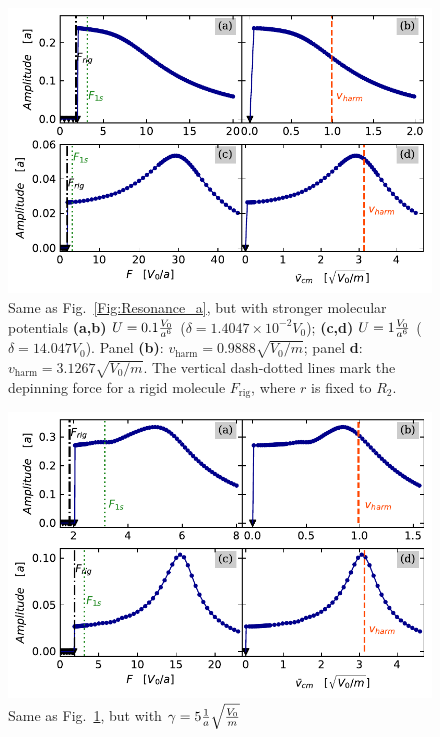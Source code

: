 \captionsetup{width=0.8\textwidth,font=normalsize}
\begin{figure}
\begin{center}
    \centering
    \includegraphics[width=0.85\linewidth]{Images/Resonance_2_b.pdf}
    \caption{Same as Fig.~\ref{Fig:Resonance_a}, but with stronger molecular potentials \textbf{(a,b)} $U = 0.1 \frac{V_0}{a^6}$ ($\delta = 1.4047 \times 10^{-2} V_0$); \textbf{(c,d)} $U = 1 \frac{V_0}{a^6}$ ($\delta = 14.047 V_0$). Panel \textbf{(b)}: $v_\text{harm} = 0.9888 \sqrt{V_0/m}$; panel \textbf{d}: $v_\text{harm} =  3.1267 \sqrt{V_0/m}$. The vertical dash-dotted lines mark the depinning force for a rigid molecule $F_\text{rig}$, where $r$ is fixed to $R_2$. }
    \label{Fig:Resonance_b}
\end{center}
\end{figure}


\begin{figure}
\begin{center}
    \centering
    \includegraphics[width=0.85\linewidth]{Images/Resonance_b.pdf}
    \caption{Same as Fig.~\ref{Fig:Resonance_b}, but with $\gamma = 5 \frac{1}{a}\sqrt{\frac{V_0}{m}}$}
    \label{Fig:Resonance_5_b}
\end{center}
\end{figure}


